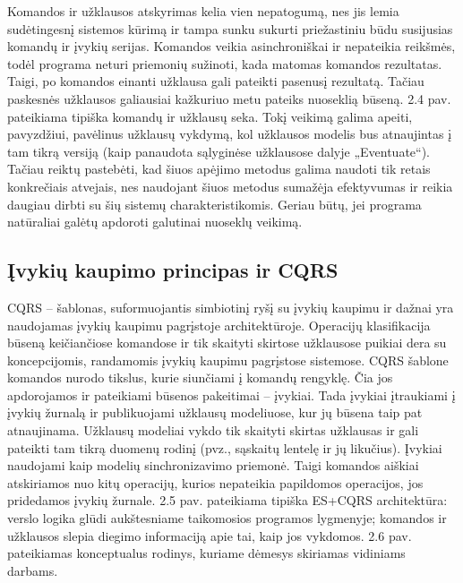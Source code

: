 Komandos ir užklausos atskyrimas kelia vien nepatogumą, nes jis lemia sudėtingesnį sistemos kūrimą ir tampa sunku sukurti priežastiniu būdu susijusias komandų ir įvykių serijas. Komandos veikia asinchroniškai ir nepateikia reikšmės, todėl programa neturi priemonių sužinoti, kada matomas komandos rezultatas. Taigi, po komandos einanti užklausa gali pateikti pasenusį rezultatą. Tačiau paskesnės užklausos galiausiai kažkuriuo metu pateiks nuoseklią būseną. 2.4 pav. pateikiama tipiška komandų ir užklausų seka. Tokį veikimą galima apeiti, pavyzdžiui, pavėlinus užklausų vykdymą, kol užklausos modelis bus atnaujintas į tam tikrą versiją (kaip panaudota sąlyginėse užklausose dalyje „Eventuate“). Tačiau reiktų pastebėti, kad šiuos apėjimo metodus galima naudoti tik retais konkrečiais atvejais, nes naudojant šiuos metodus sumažėja efektyvumas ir reikia daugiau dirbti su šių sistemų charakteristikomis. Geriau būtų, jei programa natūraliai galėtų apdoroti galutinai nuoseklų veikimą.

\subsection{Įvykių kaupimo principas ir CQRS}

CQRS – šablonas, suformuojantis simbiotinį ryšį su įvykių kaupimu ir dažnai yra naudojamas įvykių kaupimu pagrįstoje architektūroje. Operacijų klasifikacija būseną keičiančiose komandose ir tik skaityti skirtose užklausose puikiai dera su koncepcijomis, randamomis įvykių kaupimu pagrįstose sistemose. CQRS šablone komandos nurodo tikslus, kurie siunčiami į komandų rengyklę. Čia jos apdorojamos ir pateikiami būsenos pakeitimai – įvykiai. Tada įvykiai įtraukiami į įvykių žurnalą ir publikuojami užklausų modeliuose, kur jų būsena taip pat atnaujinama. Užklausų modeliai vykdo tik skaityti skirtas užklausas ir gali pateikti tam tikrą duomenų rodinį (pvz., sąskaitų lentelę ir jų likučius). Įvykiai naudojami kaip modelių sinchronizavimo priemonė. Taigi komandos aiškiai atskiriamos nuo kitų operacijų, kurios nepateikia papildomos operacijos, jos pridedamos įvykių žurnale. 2.5 pav. pateikiama tipiška ES+CQRS architektūra: verslo logika glūdi aukštesniame taikomosios programos lygmenyje; komandos ir užklausos slepia diegimo informaciją apie tai, kaip jos vykdomos. 2.6 pav. pateikiamas konceptualus rodinys, kuriame dėmesys skiriamas vidiniams darbams.

